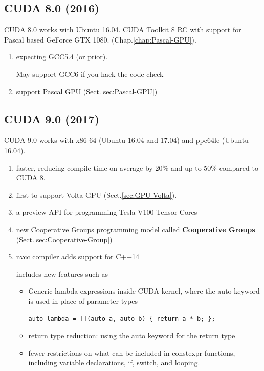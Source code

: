\subsection{CUDA 8.0 (2016)}
\label{sec:CUDA_80}

CUDA 8.0 works with Ubuntu 16.04.
CUDA Toolkit 8 RC with support for Pascal based GeForce GTX 1080.
(Chap.\ref{chap:Pascal-GPU}).

\begin{enumerate}
  \item expecting GCC5.4 (or prior).
  
  May support GCC6 if you hack the code check
  
  \item support Pascal GPU (Sect.\ref{sec:Pascal-GPU})
\end{enumerate}

\subsection{CUDA 9.0 (2017)}
\label{sec:CUDA_90}

CUDA 9.0 works with x86-64 (Ubuntu 16.04 and 17.04) and ppc64le (Ubuntu 16.04).
\begin{enumerate}
  \item faster, reducing compile time on average by 20\% and up to 50\% compared to CUDA 8.
  
  
  \item first to support Volta GPU (Sect.\ref{sec:GPU-Volta}).
  
  \item a preview API for programming Tesla V100 Tensor Cores
  
  \item new Cooperative Groups programming model called {\bf Cooperative Groups}
  (Sect.\ref{sec:Cooperative-Group})
  
  \item nvcc compiler adds support for C++14
  
includes new features such as
\begin{itemize}
  
  \item  Generic lambda expressions inside CUDA kernel, where the auto keyword
  is used in place of parameter types
  
\begin{verbatim}
auto lambda = [](auto a, auto b) { return a * b; };
\end{verbatim}


  \item return type reduction: using the auto keyword for the return type
  
  \item fewer restrictions on what can be included in constexpr functions,
  including variable declarations, if, switch, and looping.

\end{itemize}  
\end{enumerate}


